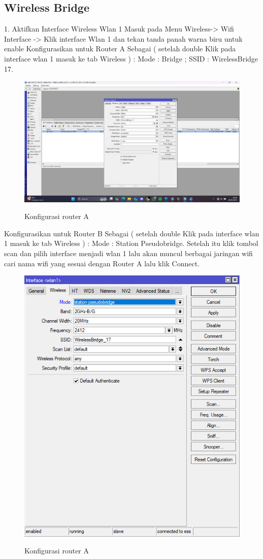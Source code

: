 \subsection{Wireless Bridge}
1. Aktifkan Interface Wireless Wlan 1 Masuk pada Menu Wireless-> Wifi Interface -> Klik interface Wlan 1 dan tekan tanda panah warna biru untuk enable Konfigurasikan untuk Router A Sebagai ( setelah double Klik pada interface wlan 1 masuk ke tab Wireless ) : Mode : Bridge ; SSID : WirelessBridge 17. 
\begin{figure}[H]
    \centering
    \includegraphics[width=0.65\linewidth]{image/wb2.jpg}
    \label{fig:inirujukan}
    \caption{Konfigurasi router A}
\end{figure}
Konfigurasikan untuk Router B Sebagai ( setelah double Klik pada interface wlan 1 masuk ke tab Wireless ) : Mode : Station Pseudobridge. Setelah itu klik tombol scan dan pilih interface menjadi wlan 1 lalu akan muncul berbagai jaringan wifi cari nama wifi yang sesuai dengan Router A lalu klik Connect.
\begin{figure}[H]
    \centering
    \includegraphics[width=0.65\linewidth]{image/wb.png}
    \label{fig:inirujukan}
    \caption{Konfigurasi router A}
\end{figure}

